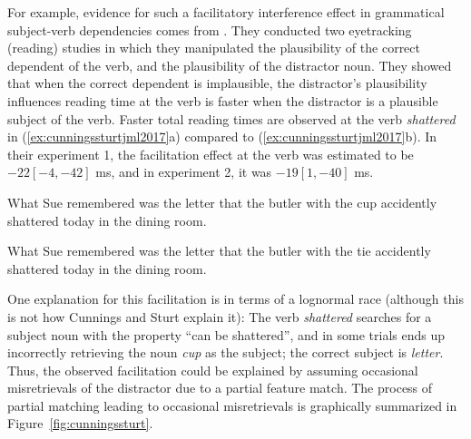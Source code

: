 \documentclass{cambridge7A}\usepackage[]{graphicx}\usepackage[]{color}
\begin{document}
For example, evidence for such a facilitatory interference effect in grammatical subject-verb dependencies comes from \cite{CunningsSturt2018}. They conducted 
 two eyetracking (reading) studies  in which they manipulated the plausibility of the correct dependent of the verb, and the plausibility of the distractor noun. They showed that when the correct dependent is implausible,  the distractor's plausibility influences reading time at the verb is faster when the distractor is a plausible subject of the verb. 
Faster total reading times are observed at the verb \textit{shattered} in (\ref{ex:cunningssturtjml2017}a) compared to (\ref{ex:cunningssturtjml2017}b). In their experiment 1, the facilitation effect at the verb was estimated to be  
$-22 [-4,-42]$ ms,  and in experiment 2, it was $-19 [1,-40]$ ms.


\begin{exe}
\ex \label{ex:cunningssturtjml2017}
\begin{xlist}
\item
 What Sue remembered was the letter that the butler with the cup accidently shattered today in the dining room.
 \item
 What Sue remembered was the letter that the butler with the tie accidently shattered today in the dining room.
\end{xlist}
\end{exe}
 
One explanation for this facilitation is in terms of a  lognormal race (although this is not how Cunnings and Sturt explain it): The verb \textit{shattered} searches for a subject noun with the property ``can be shattered'', and in some trials ends up incorrectly retrieving the noun \textit{cup} as the subject; the correct subject is \textit{letter}. Thus, the observed facilitation could be explained by assuming occasional  misretrievals of the distractor due to a partial feature match.  The process of  partial matching leading to occasional  misretrievals is graphically summarized in Figure~\ref{fig:cunningssturt}. 
\end{document}
